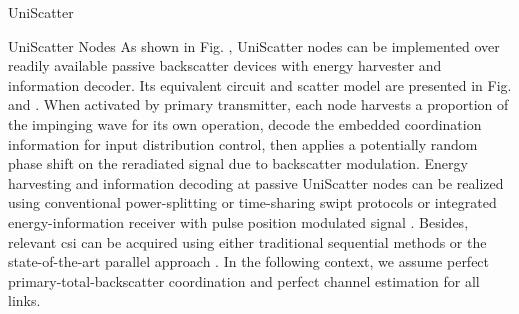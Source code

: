 \documentclass[journal]{IEEEtran}
\begin{document}
\begin{section}{UniScatter}
\begin{subsection}{UniScatter Nodes}
		As shown in Fig. , UniScatter nodes can be implemented over readily available passive backscatter devices with energy harvester and information decoder.
		Its equivalent circuit and scatter model are presented in Fig.  and .
		When activated by primary transmitter, each node harvests a proportion of the impinging wave for its own operation, decode the embedded coordination information for input distribution control, then applies a potentially random phase shift on the reradiated signal due to backscatter modulation.
		Energy harvesting and information decoding at passive UniScatter nodes can be realized using conventional power-splitting or time-sharing \gls{swipt} protocols \cite{Clerckx2019} or integrated energy-information receiver with pulse position modulated signal \cite{Kim2021a}.
		Besides, relevant \gls{csi} can be acquired using either traditional sequential methods \cite{Bharadia2015,Yang2015b,Guo2019g} or the state-of-the-art parallel approach \cite{Jin2021a}.
		In the following context, we assume perfect primary-total-backscatter coordination and perfect channel estimation for all links.
		\begin{figure*}[!t]
			\centering
			\caption{
			Block diagram, equivalent circuit, and scatter model of a UniScatter node.
			The solid and dashed vectors represent signal and energy flows.
			The scattering antenna behaves as a constant power source, where the voltage $V_0$ and current $I_0$ are introduced by incident electric field $\vec{E}_{\mathrm{I}}$ and magnetic field $\vec{H}_{\mathrm{I}}$ \cite{Huang2021}.
			}
			\label{fi:uniscatter_node}
		\end{figure*}
	\end{subsection}


\end{section}
\end{document}
